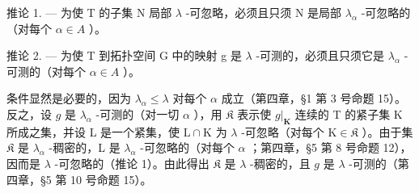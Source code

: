 推论 1. --- 为使 T 的子集 N 局部 \(\lambda\) -可忽略，必须且只须 N 是局部 \(\lambda_{\alpha}\) -可忽略的（对每个 \(\alpha \in A\) ）。

推论 2. --- 为使 T 到拓扑空间 G 中的映射 g 是 \(\lambda\) -可测的，必须且只须它是 \(\lambda_{\alpha}\) -可测的（对每个 \(\alpha \in A\) ）。

条件显然是必要的，因为 \(\lambda_{\alpha} \leqslant \lambda\) 对每个 \(\alpha\) 成立（第四章，§1 第 3 号命题 15）。反之，设 \(g\) 是 \(\lambda_{\alpha}\) -可测的（对一切 \(\alpha\) ），用 \(\mathfrak{K}\) 表示使 \(g|_{\mathbf{K}}\) 连续的 T 的紧子集 K 所成之集，并设 L 是一个紧集，使 \(\mathrm{L} \cap \mathrm{K}\) 为 \(\lambda\) -可忽略（对每个 \(\mathrm{K} \in \mathfrak{K}\) ）。由于集 \(\mathfrak{K}\) 是 \(\lambda_{\alpha}\) -稠密的，L 是 \(\lambda_{\alpha}\) -可忽略的（对每个 \(\alpha\) ；第四章，§5 第 8 号命题 12），因而是 \(\lambda\) -可忽略的（推论 1）。由此得出 \(\mathfrak{K}\) 是 \(\lambda\) -稠密的，且 \(g\) 是 \(\lambda\) -可测的（第四章，§5 第 10 号命题 15）。

